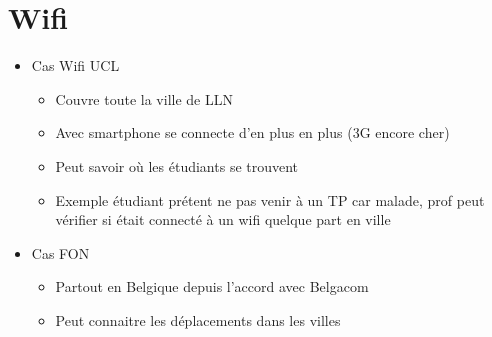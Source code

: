 \section{Wifi}

\begin{itemize}
\item Cas Wifi UCL
  \begin{itemize}
  \item Couvre toute la ville de LLN
  \item Avec smartphone se connecte d'en plus en plus (3G encore cher)
  \item Peut savoir où les étudiants se trouvent
  \item Exemple étudiant prétent ne pas venir à un TP car malade, prof peut vérifier si était connecté à un wifi quelque part en ville
  \end{itemize}
\item Cas FON
  \begin{itemize}
  \item Partout en Belgique depuis l'accord avec Belgacom
  \item Peut connaitre les déplacements dans les villes
  \end{itemize}

\end{itemize}

